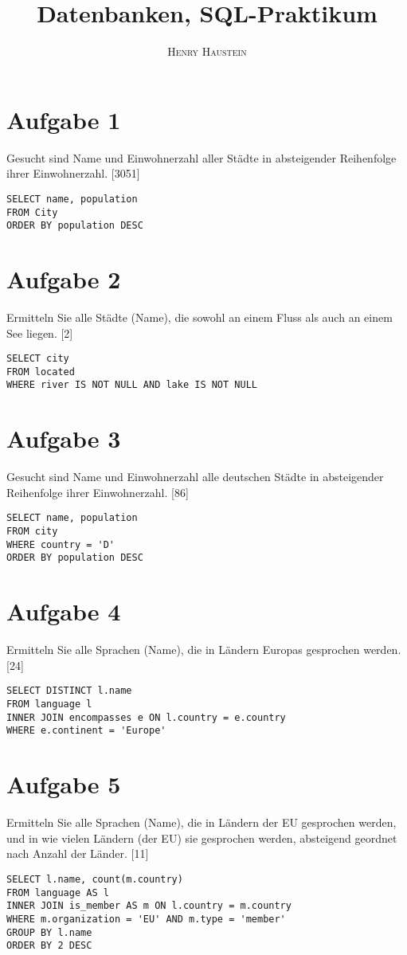\documentclass{article}
\title{\textbf{Datenbanken, SQL-Praktikum}}
\author{\textsc{Henry Haustein}}
\date{}
\begin{document}
	\maketitle
	
	\section*{Aufgabe 1}
	Gesucht sind Name und Einwohnerzahl aller Städte in absteigender Reihenfolge ihrer Einwohnerzahl. [3051]
	\begin{lstlisting}[style=sql,tabsize=2]
SELECT name, population
FROM City
ORDER BY population DESC
	\end{lstlisting}

	\section*{Aufgabe 2}
	Ermitteln Sie alle Städte (Name), die sowohl an einem Fluss als auch an einem See liegen. [2]
	\begin{lstlisting}[style=sql,tabsize=2]
SELECT city
FROM located
WHERE river IS NOT NULL AND lake IS NOT NULL
	\end{lstlisting}

	\section*{Aufgabe 3}
	Gesucht sind Name und Einwohnerzahl alle deutschen Städte in absteigender Reihenfolge ihrer Einwohnerzahl. [86]
	\begin{lstlisting}[style=sql,tabsize=2]
SELECT name, population
FROM city
WHERE country = 'D'
ORDER BY population DESC
	\end{lstlisting}
	
	\section*{Aufgabe 4}
	 Ermitteln Sie alle Sprachen (Name), die in Ländern Europas gesprochen werden. [24]
	\begin{lstlisting}[style=sql,tabsize=2]
SELECT DISTINCT l.name
FROM language l 
INNER JOIN encompasses e ON l.country = e.country 
WHERE e.continent = 'Europe'
	\end{lstlisting}
	
	\section*{Aufgabe 5}
	Ermitteln Sie alle Sprachen (Name), die in Ländern der EU gesprochen werden, und in wie vielen Ländern (der EU) sie gesprochen werden, absteigend geordnet nach Anzahl der Länder. [11]
	\begin{lstlisting}[style=sql,tabsize=2]
SELECT l.name, count(m.country)
FROM language AS l 
INNER JOIN is_member AS m ON l.country = m.country 
WHERE m.organization = 'EU' AND m.type = 'member' 
GROUP BY l.name 
ORDER BY 2 DESC
	\end{lstlisting}
	
\end{document}
